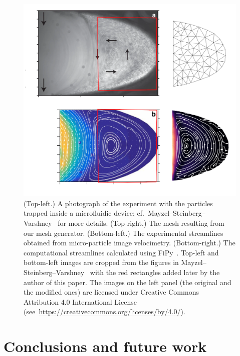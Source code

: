 \documentclass[11pt]{article}
\begin{document}
\begin{figure}[htbp]
\centering
\includegraphics[width=\textwidth]{./esimerkki_vertailu.png}
\caption{(Top-left.) A photograph of the experiment with the particles trapped
  inside a microfluidic device;
  cf.~Mayzel--Steinberg--Varshney~\cite{mayzel2019stokes} for more details.
  (Top-right.) The mesh resulting from our mesh generator. (Bottom-left.)  The
  experimental streamlines obtained from micro-particle image velocimetry.
  (Bottom-right.) The computational streamlines calculated using
  FiPy~\cite{FiPy2009}.  Top-left and bottom-left images are cropped from the
  figures in Mayzel--Steinberg--Varshney~\cite{mayzel2019stokes} with the red
  rectangles added later by the author of this paper.  The images on the left
  panel (the original and the modified ones) are licensed under Creative Commons
  Attribution 4.0 International License
  (see~\url{https://creativecommons.org/licenses/by/4.0/}).}
\label{fig:esimerkki}
\end{figure}

\section{Conclusions and future work}
\label{sec:org615e973}



\end{document}
